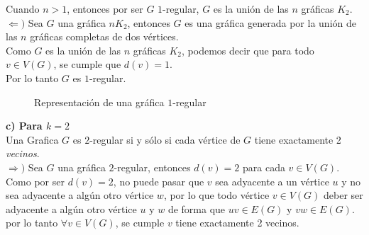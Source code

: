 \documentclass[12pt]{article}
\begin{document}
Cuando $n > 1$, entonces por ser $G$ $1$-regular, $G$ es la unión de las $n$ gráficas $K_2$.\\

$\Longleftarrow)$ Sea $G$ una gráfica $nK_2$, entonces $G$ es una gráfica generada por la unión 
de las $n$ gráficas completas de dos vértices.\\

Como $G$ es la unión de las $n$ gráficas $K_2$, podemos decir que para todo $v \in V(G)$, se cumple que $d(v) = 1$.\\

Por lo tanto $G$ es $1$-regular.\\

\begin{figure}[h!]
    \centering
    \begin{minipage}{0.6\textwidth}
        \centering
        \caption{Representación de una gráfica $1$-regular}
    \end{minipage}
\end{figure}

\textbf{c) Para $k = 2$} \\

Una Grafica $G$ es $2$-regular si y sólo si cada vértice de $G$ tiene exactamente 2 \textit{vecinos}.\\

$\Longrightarrow)$ Sea $G$ una gráfica $2$-regular, entonces $d(v) = 2$ para cada $v \in V(G)$.\\

Como por ser $d(v) = 2$, no puede pasar que $v$ sea adyacente a un vértice $u$ y no sea adyacente 
a algún otro vértice $w$, por lo que todo vértice $v \in V(G)$ deber ser adyacente a algún otro vértice $u$ y $w$
de forma que $uv \in E(G)$ y $vw \in E(G)$.\\

por lo tanto $\forall v \in V(G)$, se cumple $v$ tiene exactamente 2 vecinos.\\
\end{document}
